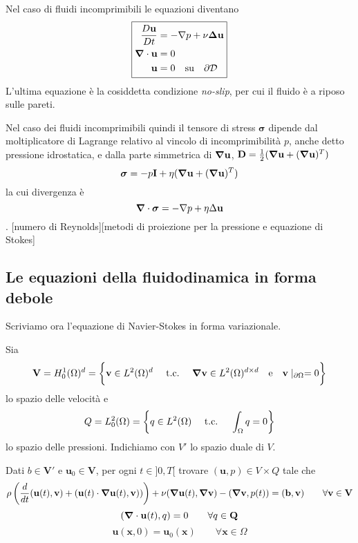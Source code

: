 Nel caso di fluidi incomprimibili le equazioni diventano
\begin{equation}
\boxed{
\begin{aligned}
\frac{D\mathbf{u}}{Dt} &= - \nabla p + \nu \boldsymbol{\Delta} \mathbf{u} \\
\boldsymbol{\nabla} \cdot  \mathbf{u} &= 0 \\
\mathbf{u} &= 0 \quad \text{su} \quad \partial \mathcal{D}
\end{aligned}
}
\end{equation}
L'ultima equazione è la cosiddetta condizione \emph{no-slip}, per cui il fluido è a riposo sulle pareti.

Nel caso dei fluidi incomprimibili quindi il tensore di stress $\boldsymbol{\sigma}$ dipende dal moltiplicatore di Lagrange relativo al vincolo di incomprimibilità $p$, anche detto pressione idrostatica, e dalla parte simmetrica di $\boldsymbol{\nabla}\mathbf{u}$, $\mathbf{D}=\frac{1}{2}(\boldsymbol{\nabla}\mathbf{u}+(\boldsymbol{\nabla}\mathbf{u})^{T})$
$$\boldsymbol{\sigma}=-p\mathbf{I}+\eta(\boldsymbol{\nabla}\mathbf{u}+(\boldsymbol{\nabla}\mathbf{u})^{T})$$
la cui divergenza è
$$\boldsymbol{\nabla}\cdot\boldsymbol{\sigma}=-\nabla p+\eta\Delta\mathbf{u}$$.
[numero di Reynolds][metodi di proiezione per la pressione e equazione di Stokes]

\subsection{Le equazioni della fluidodinamica in forma debole}
Scriviamo ora l'equazione di Navier-Stokes in forma variazionale.

Sia
$$\mathbf{V} = H^1_0(\Omega)^d = \bigg \{ \mathbf{v} \in L^2(\Omega)^d \quad \ \text{t.c.}\  \quad \boldsymbol{\nabla} \mathbf{v} \in L^2(\Omega)^{d \times d} \quad \text{e} \quad \mathbf{v}\mid_{\partial \Omega} = 0 \bigg \} $$
lo spazio delle velocità e 
$$Q = L^2_0(\Omega) = \left  \{ q \in L^2(\Omega) \quad \ \text{t.c.}\  \quad \int_{\Omega}q=0 \right  \}$$ lo spazio delle pressioni. Indichiamo con $V'$ lo spazio duale di $V$.

Dati $b \in \mathbf{V}'$ e $\mathbf{u}_0 \in \mathbf{V}$, per ogni $t \in ]0,T[$ trovare $(\mathbf{u},p) \in V \times Q$ tale che
\begin{multline*}
\rho \left ( \frac{d}{dt}\ps{\mathbf{u}(t)}{\mathbf{v}} + \ps{\mathbf{u}(t)\cdot \Nabla\mathbf{u}(t)}{\mathbf{v})}\right)+ \nu\ps{\Nabla\mathbf{u}(t)}{\Nabla\mathbf{v}}-\ps{\Nabla \mathbf{v}}{p(t)}=\ps{\mathbf{b}}{\mathbf{v}} \qquad \forall \mathbf{v}\in\mathbf{V}
\end{multline*}
$$\ps{\Nabla\cdot\mathbf{u}(t)}{q}=0 \qquad \forall q\in\mathbf{Q}$$
$$\mathbf{u}(\mathbf{x},0)=\mathbf{u}_0(\mathbf{x}) \qquad \forall \mathbf{x}\in\Omega$$

